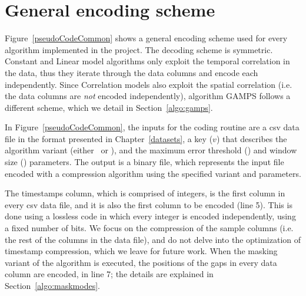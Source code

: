 

\vspace{-30pt}
\section{General encoding scheme}
\label{algo:details}


\vspace{-5pt}
Figure~\ref{pseudoCodeCommon} shows a general encoding scheme used for every algorithm implemented in the project. The decoding scheme is symmetric. Constant and Linear model algorithms only exploit the temporal correlation in the data, thus they iterate through the data columns and encode each independently. Since Correlation models also exploit the spatial correlation (i.e. the data columns are \textit{not} encoded independently), algorithm GAMPS follows a different scheme, which we detail in Section~\ref{algo:gamps}.


In Figure~\ref{pseudoCodeCommon}, the inputs for the coding routine are a csv data file in the format presented in Chapter~\ref{datasets}, a key ($v$) that describes the algorithm variant (either \maskalgo\ or \NOmaskalgo), and the maximum error threshold (\maxerror) and window size (\win) parameters. The output is a binary file, which represents the input file encoded with a compression algorithm using the specified variant and parameters.


\vspace{+5pt}



The timestamps column, which is comprised of integers, is the first column in every csv data file, and it is also the first column to be encoded (line 5). This is done using a lossless code in which every integer is encoded independently, using a fixed number of bits. We focus on the compression of the sample columns (i.e. the rest of the columns in the data file), and do not delve into the optimization of timestamp compression, which we leave for future work. When the masking variant of the algorithm is executed, the positions of the gaps in every data column are encoded, in line 7; the details are explained in Section~\ref{algo:maskmodes}. 

